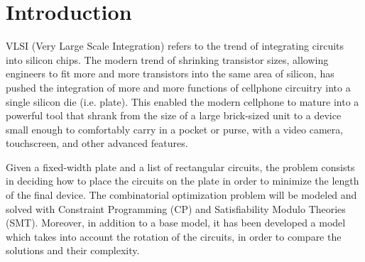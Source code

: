 \section{Introduction}

VLSI (Very Large Scale Integration) refers to the trend of integrating circuits into silicon chips. The modern trend of shrinking transistor sizes, allowing engineers to fit more and more transistors into the same area of silicon, has pushed the integration of more and more functions of cellphone circuitry into a single silicon die (i.e. plate). This enabled the modern cellphone to mature into a powerful tool that shrank from the size of a large brick-sized unit to a device small enough to comfortably carry in a pocket or purse, with a video camera, touchscreen, and other advanced features.

Given a fixed-width plate and a list of rectangular circuits, the problem consists in deciding how to place the circuits on the plate in order to minimize the length of the final device. The combinatorial optimization problem will be modeled and solved with Constraint Programming (CP) and Satisfiability Modulo Theories (SMT). Moreover, in addition to a base model, it has been developed a model which takes into account the rotation of the circuits, in order to compare the solutions and their complexity.

\newpage

